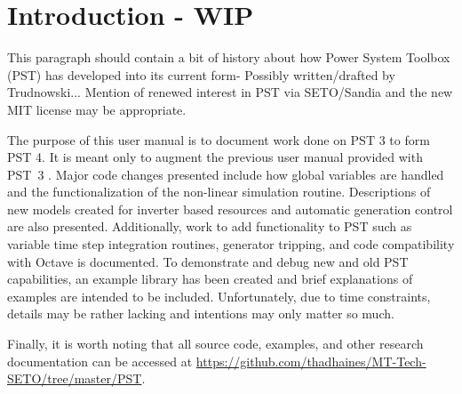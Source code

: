 \vspace{2em} %
\chapter*{Introduction  - WIP}

This paragraph should contain a bit of history about how Power System Toolbox (PST) has developed into its current form- Possibly written/drafted by Trudnowski...
Mention of renewed interest in PST via SETO/Sandia and the new MIT license may be appropriate.

\vspace{1em}
The purpose of this user manual is to document work done on PST 3 to form PST 4. 
It is meant only to augment the previous user manual provided with \mbox{PST 3} \cite{PST3manual}.
%
Major code changes presented include 
how global variables are handled
and the
functionalization of the non-linear simulation routine.
%
Descriptions of new models created for
inverter based resources
and
automatic generation control
are also presented.
%
Additionally, work to add functionality to PST such as
variable time step integration routines,
generator tripping, %
and
code compatibility with Octave
is documented.
%
To demonstrate and debug new and old PST capabilities, an example library has been created and brief explanations of examples are intended to be included.
Unfortunately, due to time constraints, details may be rather lacking and intentions may only matter so much.

\vspace{1em}
Finally, it is worth noting that all source code, examples, and other research documentation can be accessed at 
\href{https://github.com/thadhaines/MT-Tech-SETO/tree/master/PST}{https://github.com/thadhaines/MT-Tech-SETO/tree/master/PST}.